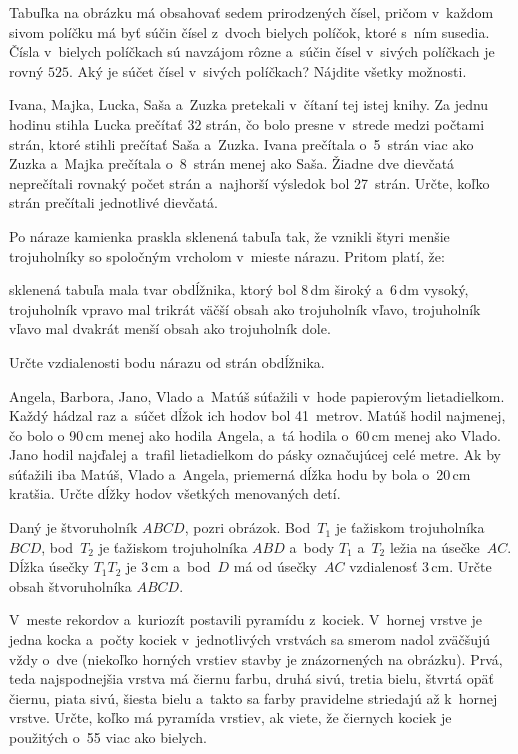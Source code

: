 {%
Tabuľka na \ifobrazkyvedla{}obrázku\else{}\obr{}\fi{} má obsahovať sedem prirodzených čísel, pričom v~každom
sivom políčku má byť súčin čísel z~dvoch bielych políčok, ktoré s~ním susedia.
Čísla v~bielych políčkach sú navzájom rôzne a~súčin čísel v~sivých políčkach
je rovný $525$. Aký je súčet čísel v~sivých políčkach? Nájdite všetky možnosti.
%
}

{%
Ivana, Majka, Lucka, Saša a~Zuzka pretekali v~čítaní tej istej knihy.
Za jednu hodinu stihla Lucka prečítať 32 strán, čo bolo presne v~strede
medzi počtami strán, ktoré stihli prečítať Saša a~Zuzka.
Ivana prečítala o~5~strán viac ako Zuzka a~Majka prečítala o~8~strán menej ako
Saša. Žiadne dve dievčatá neprečítali rovnaký počet strán a~najhorší výsledok bol 27~strán.
Určte, koľko strán prečítali jednotlivé dievčatá.}

{%
Po náraze kamienka praskla sklenená tabuľa tak, že vznikli štyri menšie
trojuholníky so spoločným vrcholom v~mieste nárazu.
Pritom platí, že:
\begin{itemize}
\iitem sklenená tabuľa mala tvar obdĺžnika, ktorý bol 8\,dm široký a~6\,dm vysoký,
\iitem trojuholník vpravo mal trikrát väčší obsah ako trojuholník vľavo,
\iitem trojuholník vľavo mal dvakrát menší obsah ako trojuholník dole.
\end{itemize}
Určte vzdialenosti bodu nárazu od strán obdĺžnika.}

{%
Angela, Barbora, Jano, Vlado a~Matúš súťažili v~hode
papierovým lietadielkom.
Každý hádzal raz a~súčet dĺžok ich hodov bol 41~metrov.
Matúš hodil najmenej, čo bolo o 90\,cm menej ako hodila Angela,
a~tá hodila o~60\,cm menej ako Vlado.
Jano hodil najďalej a~trafil lietadielkom do pásky označujúcej celé metre.
Ak by súťažili iba Matúš, Vlado a~Angela, priemerná dĺžka hodu by
bola o~20\,cm kratšia.
Určte dĺžky hodov všetkých menovaných detí.
}

{%
Daný je štvoruholník $ABCD$, pozri \ifobrazkyvedla{}obrázok\else\obr{}\fi{}.
Bod~$T_1$ je ťažiskom trojuholníka $BCD$, bod~$T_2$ je ťažiskom trojuholníka
$ABD$ a~body $T_1$ a~$T_2$ ležia na úsečke~$AC$.
Dĺžka úsečky $T_1T_2$ je 3\,cm a~bod~$D$ má od úsečky~$AC$ vzdialenosť 3\,cm.
Určte obsah štvoruholníka $ABCD$.
\ifobrazkyvedla\else{}\fi
}

{%
V~meste rekordov a~kuriozít postavili pyramídu z~kociek.
V~hornej vrstve je jedna kocka a~počty kociek v~jednotlivých vrstvách sa
smerom nadol zväčšujú vždy o~dve (niekoľko horných vrstiev stavby je znázornených
na \ifobrazkyvedla{}obrázku\else\obr{}\fi{}).
Prvá, teda najspodnejšia vrstva má čiernu farbu, druhá sivú, tretia bielu,
štvrtá opäť čiernu, piata sivú, šiesta bielu a~takto sa farby pravidelne
striedajú až k~hornej vrstve.
Určte, koľko má pyramída vrstiev, ak viete, že čiernych kociek je použitých o~55 viac ako bielych.
\ifobrazkyvedla\else{}\fi
}

